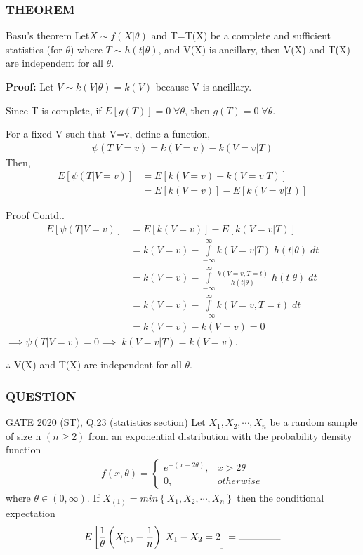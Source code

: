 \documentclass{beamer}
\providecommand{\fn}[1]{\ensuremath{f\left(#1\right)}}
\providecommand{\sbrak}[1]{\ensuremath{{}\left[#1\right]}}
\providecommand{\brak}[1]{\ensuremath{\left(#1\right)}}
\providecommand{\cbrak}[1]{\ensuremath{\left\{#1\right\}}}
\begin{document}
\begin{frame}
\frametitle{THEOREM}
\begin{block}{Basu's theorem}
Let$ X\sim f\brak{X|\theta}$ and T=T(X) be a complete and sufficient statistics (for $\theta$) where $T\sim h\brak{t|\theta}$, and V(X) is
ancillary, then V(X) and T(X) are independent for all $\theta$.
\end{block}
\textbf{Proof: }
    Let $V\sim k\brak{V|\theta}=k\brak{V}$ because V is ancillary.
    
    Since T is complete, if $E[g\brak{T}]=0 \;\forall \theta$, then $g\brak{T}=0 \;\forall \theta$.
    
    For a fixed V such that V=v, define a function,
    \begin{align}
        \psi\brak{T|V=v}=k\brak{V=v}-k\brak{V=v|T}
    \end{align}
    Then,
     \begin{align}
        E[\psi\brak{T|V=v}]&= E[k\brak{V=v}-k\brak{V=v|T}]\\
        &=E[k\brak{V=v}]-E[k\brak{V=v|T}]
    \end{align}
\end{frame}

\begin{frame}{Proof Contd..}
    \begin{align}
        E[\psi\brak{T|V=v}]
        &=E[k\brak{V=v}]-E[k\brak{V=v|T}]\\
        &=k\brak{V=v}-\int\limits_{-\infty}^{\infty} k\brak{V=v|T}\;h\brak{t|\theta}\; dt\\
        &=k\brak{V=v}-\int\limits_{-\infty}^{\infty} \frac{k\brak{V=v,T=t}}{h\brak{t|\theta}}\;h\brak{t|\theta}\; dt\\
        &=k\brak{V=v}-\int\limits_{-\infty}^{\infty} {k\brak{V=v,T=t}}\; dt\\
        &=k\brak{V=v}-k\brak{V=v}=0
    \end{align} $\implies\psi\brak{T|V=v}=0\implies\;k\brak{V=v|T}=k\brak{V=v}$.
    
    $\therefore$ V(X) and T(X) are independent for all $\theta$.
\end{frame}

\begin{frame}
\frametitle{QUESTION}
\begin{block}{GATE 2020 (ST), Q.23 (statistics section)}
    Let $X_1,X_2,\cdots,X_n$ be a random sample of size n $(n\ge2)$ from an exponential distribution with the probability density function
\begin{align}
\fn{x,\theta}=
\begin{cases}
e^{-(x-2\theta)}, & x>2\theta
\\
0, & otherwise
\end{cases}
\end{align}
where $\theta\in\brak{0,\infty}$. If $X_{(1)}=min\cbrak{X_1,X_2,\cdots,X_n}$ then the conditional expectation 
\begin{align}
     \nonumber   E\sbrak{\frac{1}{\theta}\brak{X_{(1)}-\frac{1}{n}}|X_1-X_2=2}=\rule{1.5cm}{0.15mm}
\end{align}
\end{block}
\end{frame}
\end{document}
